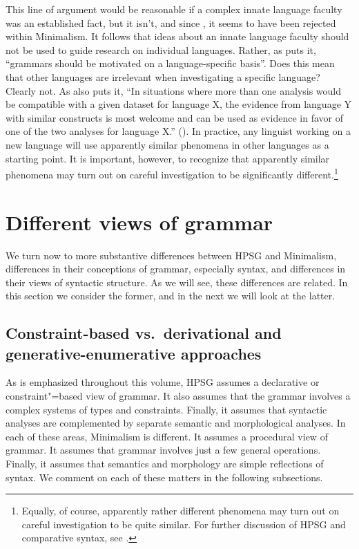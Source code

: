 \documentclass[output=paper]{langsci/langscibook}
\begin{document}
This line of argument would be reasonable if a complex innate language
faculty was an established fact, but it isn't, and since \citet*{HCF2002a}, it seems to have been
rejected within Minimalism. It follows that ideas about an innate language faculty should not be
used to guide research on individual languages. Rather, as \citet[25]{MuellerCoreGram} puts it,
``grammars should be motivated on a language-specific basis''. Does this mean that other languages are
irrelevant when investigating a specific language? Clearly not. As 
also puts it, ``In situations where more than one analysis would be compatible with a given dataset
for language X, the evidence from language Y with similar constructs is most welcome and can be used
as evidence in favor of one of the two analyses for language X.'' (\citeyear[43]{MuellerCoreGram}). In
practice, any linguist working on a new language will use apparently similar phenomena in other
languages as a starting point. It is important, however, to recognize that apparently similar
phenomena may turn out on careful investigation to be significantly different.\footnote{%
  Equally, of course, apparently rather different phenomena may turn out on careful investigation to
  be quite similar. For further discussion of HPSG and comparative syntax, see .%
} 

\section{Different views of grammar}
\label{sec:min-views-grammar}

We turn now to more substantive differences between HPSG and Minimalism, differences in their conceptions of grammar, especially syntax, and differences in their views of syntactic structure. As we will see, these differences are related. In this section we consider the former, and in the next we will look at the latter.

\subsection{Constraint-based vs.\ derivational and generative-enumerative approaches}

As is emphasized throughout this volume, HPSG assumes a declarative or constraint"=based view of
grammar. It also assumes that the grammar involves a complex systems of types and
constraints. Finally, it assumes that syntactic analyses are complemented by separate semantic and
morphological analyses. In each of these areas, Minimalism is different. It assumes a procedural
view of grammar. It assumes that grammar involves just a few general operations. Finally, it assumes
that semantics and morphology are simple reflections of syntax. We comment on each of these matters
in the following subsections. 
\end{document}
